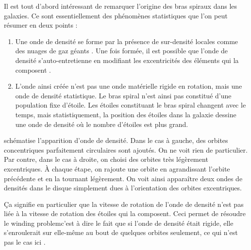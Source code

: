 \bigskip

Il est tout d'abord intéressant de remarquer l'origine des bras spiraux dans les galaxies. Ce sont essentiellement des phénomènes statistiques que l'on peut résumer en deux points : 
\begin{enumerate}
\item Une onde de densité se forme par la présence de sur-densité locales comme des nuages de gaz géants \citep{donghia2013self}. Une fois formée, il est possible que l'onde de densité s'auto-entretienne en modifiant les excentricités des éléments qui la composent \citep{binney2008book}.

\item L'onde ainsi créée n'est pas une onde matérielle rigide en rotation, mais une onde de densité statistique. Le bras spiral n'est ainsi pas constitué d'une population fixe d'étoile. Les étoiles constituant le bras spiral changent avec le temps, mais statistiquement, la position des étoiles dans la galaxie dessine une onde de densité où le nombre d'étoiles est plus grand. 
\end{enumerate}

 schématise l'apparition d'onde de densité. Dans le cas à gauche, des orbites concentriques parfaitement circulaires sont ajoutés. On ne voit rien de particulier. Par contre, dans le cas à droite, on choisi des orbites très légèrement excentriques. À chaque étape, on rajoute une orbite en agrandissant l'orbite précédente et en la tournant légèrement. On voit ainsi apparaître deux ondes de densités dans le disque simplement dues à l'orientation des orbites excentriques.

Ça signifie en particulier que la vitesse de rotation de l'onde de densité n'est pas liée à la vitesse de rotation des étoiles qui la composent. Ceci permet de résoudre le \og winding problem\fg c'est à dire le fait que si l'onde de densité était rigide, elle s'enroulerait sur elle-même au bout de quelques orbites seulement, ce qui n'est pas le cas ici \citep{binney2008book}.

